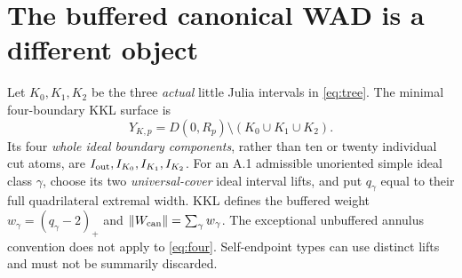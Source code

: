 \section{The buffered canonical WAD is a different object}
\label{sec:buffer}
Let $K_0,K_1,K_2$ be the three
\emph{actual} little Julia intervals in
\eqref{eq:tree}.  The minimal
four-boundary KKL surface is
\begin{equation}\label{eq:four}
 Y_{K,p}=D(0,R_p)\setminus(K_0\cup K_1\cup K_2).
\end{equation}
Its four \emph{whole ideal boundary
components}, rather than ten or
twenty individual cut atoms, are
$I_{\rm out},I_{K_0},I_{K_1},I_{K_2}$.
For an A.1 admissible unoriented
simple ideal class $\gamma$,
choose its two \emph{universal-cover}
ideal interval lifts, and put
$q_\gamma$ equal to their full
quadrilateral extremal width.
KKL \cite[Appendix A.2.3--A.2.5]{KKL2026}
defines the buffered weight
$w_\gamma=(q_\gamma-2)_+$ and
$\lVert W_{\rm can}\rVert=\sum_\gamma
w_\gamma$.  The exceptional
unbuffered annulus convention
does not apply to \eqref{eq:four}.
Self-endpoint types can use
distinct lifts and must not be
summarily discarded.

